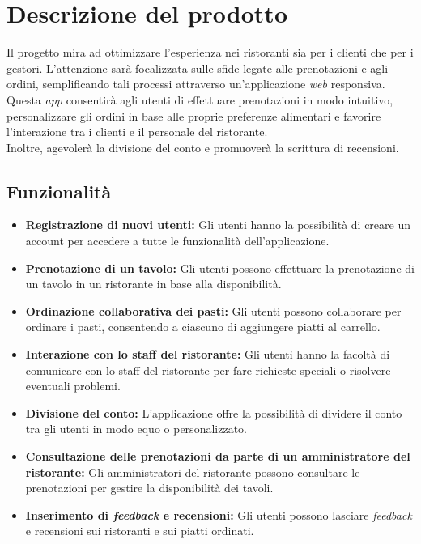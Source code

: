 \section{Descrizione del prodotto}
Il progetto mira ad ottimizzare l'esperienza nei ristoranti sia per i clienti che per i gestori.
L'attenzione sarà focalizzata sulle sfide legate alle prenotazioni e agli ordini, semplificando tali 
processi attraverso un'applicazione \textit{web} responsiva.
Questa \textit{app} consentirà agli utenti di effettuare prenotazioni in modo intuitivo, personalizzare 
gli ordini in base alle proprie preferenze alimentari e favorire l'interazione tra i clienti e 
il personale del ristorante. \\
Inoltre, agevolerà la divisione del conto e promuoverà la scrittura di recensioni.


\subsection{Funzionalità}

\begin{itemize}
	\item \textbf{Registrazione di nuovi utenti:} Gli utenti hanno la possibilità di creare un account per accedere a tutte le funzionalità dell'applicazione.
	\item \textbf{Prenotazione di un tavolo:} Gli utenti possono effettuare la prenotazione di un tavolo in un ristorante in base alla disponibilità.
	\item \textbf{Ordinazione collaborativa dei pasti:} Gli utenti possono collaborare per ordinare i pasti, consentendo a ciascuno di aggiungere piatti al carrello.
	\item \textbf{Interazione con lo staff del ristorante:} Gli utenti hanno la facoltà di comunicare con lo staff del ristorante per fare richieste speciali o risolvere eventuali problemi.
	\item \textbf{Divisione del conto:} L'applicazione offre la possibilità di dividere il conto tra gli utenti in modo equo o personalizzato.
	\item \textbf{Consultazione delle prenotazioni da parte di un amministratore del ristorante:} Gli amministratori del ristorante possono consultare le prenotazioni per gestire la disponibilità dei tavoli.
	\item \textbf{Inserimento di \textit{feedback} e recensioni:} Gli utenti possono lasciare \textit{feedback} e recensioni sui ristoranti e sui piatti ordinati.
\end{itemize}

